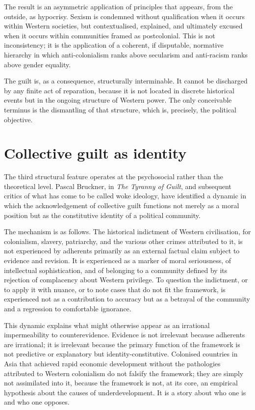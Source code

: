 \documentclass[12pt,a4paper]{article}
\begin{document}
	The result is an asymmetric application of principles that appears, from the outside,
	as hypocrisy. Sexism is condemned without qualification when it occurs within Western
	societies, but contextualised, explained, and ultimately excused when it occurs
	within communities framed as postcolonial. This is not inconsistency; it is the
	application of a coherent, if disputable, normative hierarchy in which
	anti-colonialism ranks above secularism and anti-racism ranks above gender equality.
	
	The guilt is, as a consequence, structurally interminable. It cannot be discharged
	by any finite act of reparation, because it is not located in discrete historical
	events but in the ongoing structure of Western power. The only conceivable terminus
	is the dismantling of that structure, which is, precisely, the political objective.
	
	\section{Collective guilt as identity}
	
	The third structural feature operates at the psychosocial rather than the
	theoretical level. Pascal Bruckner, in \emph{The Tyranny of Guilt}, and subsequent
	critics of what has come to be called woke ideology, have identified a dynamic in
	which the acknowledgement of collective guilt functions not merely as a moral
	position but as the constitutive identity of a political community.
	
	The mechanism is as follows. The historical indictment of Western civilisation, for
	colonialism, slavery, patriarchy, and the various other crimes attributed to it, is
	not experienced by adherents primarily as an external factual claim subject to
	evidence and revision. It is experienced as a marker of moral seriousness, of
	intellectual sophistication, and of belonging to a community defined by its
	rejection of complacency about Western privilege. To question the indictment, or to
	apply it with nuance, or to note cases that do not fit the framework, is experienced
	not as a contribution to accuracy but as a betrayal of the community and a
	regression to comfortable ignorance.
	
	This dynamic explains what might otherwise appear as an irrational impermeability
	to counterevidence. Evidence is not irrelevant because adherents are irrational; it
	is irrelevant because the primary function of the framework is not predictive or
	explanatory but identity-constitutive. Colonised countries in Asia that achieved
	rapid economic development without the pathologies attributed to Western colonialism
	do not falsify the framework; they are simply not assimilated into it, because the
	framework is not, at its core, an empirical hypothesis about the causes of
	underdevelopment. It is a story about who one is and who one opposes.
	
\end{document}
